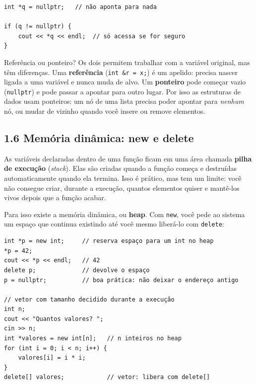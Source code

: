\begin{codigo}
\begin{Verbatim}[breaklines=true, breaksymbolleft={}, fontsize=\footnotesize]
int *q = nullptr;   // não aponta para nada

if (q != nullptr) {
    cout << *q << endl;  // só acessa se for seguro
}
\end{Verbatim}
\end{codigo}

\begin{destaque}{Referência ou ponteiro?}
Os dois permitem trabalhar com a variável original, mas têm diferenças. Uma \textbf{referência} (\texttt{int \&r = x;}) é um apelido: precisa nascer ligada a uma variável e nunca muda de alvo. Um \textbf{ponteiro} pode começar vazio (\texttt{nullptr}) e pode passar a apontar para outro lugar. Por isso as estruturas de dados usam ponteiros: um nó de uma lista precisa poder apontar para \textit{nenhum} nó, ou mudar de vizinho quando você insere ou remove elementos.
\end{destaque}

\subsection{1.6 Memória dinâmica: new e delete}

As variáveis declaradas dentro de uma função ficam em uma área chamada \textbf{pilha de execução} (\textit{stack}). Elas são criadas quando a função começa e destruídas automaticamente quando ela termina. Isso é prático, mas tem um limite: você não consegue criar, durante a execução, quantos elementos quiser e mantê-los vivos depois que a função acabar.

Para isso existe a memória dinâmica, ou \textbf{heap}. Com \texttt{new}, você pede ao sistema um espaço que continua existindo até você mesmo liberá-lo com \texttt{delete}:

\begin{codigo}
\begin{Verbatim}[breaklines=true, breaksymbolleft={}, fontsize=\footnotesize]
int *p = new int;     // reserva espaço para um int no heap
*p = 42;
cout << *p << endl;   // 42
delete p;             // devolve o espaço
p = nullptr;          // boa prática: não deixar o endereço antigo

// vetor com tamanho decidido durante a execução
int n;
cout << "Quantos valores? ";
cin >> n;
int *valores = new int[n];   // n inteiros no heap
for (int i = 0; i < n; i++) {
    valores[i] = i * i;
}
delete[] valores;            // vetor: libera com delete[]
\end{Verbatim}
\end{codigo}

